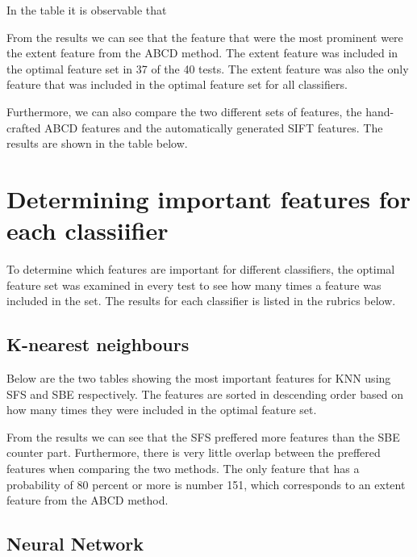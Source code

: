 \documentclass{kththesis}
\begin{document}
    In the table it is observable that 


From the results we can see that the feature that were the most prominent were the extent feature from the ABCD method. The extent feature was included in the optimal feature set in 37 of the 40 tests. The extent feature was also the only feature that was included in the optimal feature set for all classifiers.

Furthermore, we can also compare the two different sets of features, the hand-crafted ABCD features and the automatically generated SIFT features. The results are shown in the table below.



\section{Determining important features for each classiifier}

To determine which features are important for different classifiers, the optimal feature set was examined in every test to see how many times a feature was included in the set. The results for each classifier is listed in the rubrics below.

\subsection{K-nearest neighbours}

Below are the two tables showing the most important features for KNN using SFS and SBE respectively. The features are sorted in descending order based on how many times they were included in the optimal feature set. 


From the results we can see that the SFS preffered more features than the SBE counter part. Furthermore, there is very little overlap between the preffered features when comparing the two methods. The only feature that has a probability of 80 percent or more is number 151, which corresponds to an extent feature from the ABCD method.



\subsection{Neural Network}
\end{document}
